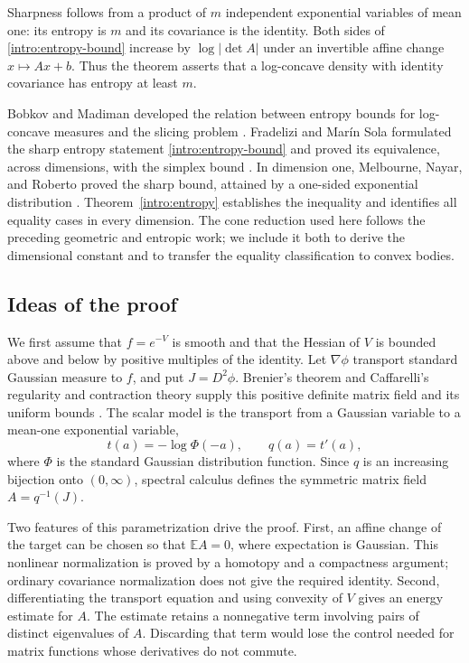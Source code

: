 \documentclass[11pt]{article}
\theoremstyle{definition}
\theoremstyle{remark}
\numberwithin{equation}{section}
\begin{document}
Sharpness follows from a product of $m$ independent exponential variables
of mean one: its entropy is $m$ and its covariance is the identity.
Both sides of \eqref{intro:entropy-bound} increase by $\log|\det A|$
under an invertible affine change $x\mapsto Ax+b$.  Thus the theorem
asserts that a log-concave density with identity covariance has entropy
at least $m$.

Bobkov and Madiman developed the relation between entropy bounds for
log-concave measures and the slicing problem \cite{BobkovMadiman2011}.
Fradelizi and Mar\'in Sola formulated the sharp entropy statement
\eqref{intro:entropy-bound} and proved its equivalence, across dimensions,
with the simplex bound \cite[Conjecture~3(iii) and Proposition~5.2]{FradeliziMarinSola2026}.
In dimension one, Melbourne, Nayar, and Roberto proved the sharp bound,
attained by a one-sided exponential distribution
\cite[Theorem~1.1]{MelbourneNayarRoberto2026}.
Theorem~\ref{intro:entropy} establishes the inequality and identifies
all equality cases in every dimension.
The cone reduction used here follows the preceding geometric and
entropic work; we include it both to derive the dimensional constant
and to transfer the equality classification to convex bodies.

\subsection{Ideas of the proof}

We first assume that $f=e^{-V}$ is smooth and that the Hessian of $V$ is
bounded above and below by positive multiples of the identity.
Let $\nabla\phi$ transport standard Gaussian measure to $f$, and put
$J=D^2\phi$.  Brenier's theorem and Caffarelli's regularity and
contraction theory supply this positive definite matrix field and its
uniform bounds
\cite{Brenier1991,McCann1995,Caffarelli2000,CorderoErausquinFigalli2019}.
The scalar model is the transport from a Gaussian variable to a
mean-one exponential variable,
\[
 t(a)=-\log\Phi(-a),\qquad q(a)=t'(a),
\]
where $\Phi$ is the standard Gaussian distribution function.  Since $q$
is an increasing bijection onto $(0,\infty)$, spectral calculus defines
the symmetric matrix field $A=q^{-1}(J)$.

Two features of this parametrization drive the proof.  First, an affine
change of the target can be chosen so that $\mathbb E A=0$, where expectation
is Gaussian.  This nonlinear normalization is proved by a homotopy and
a compactness argument; ordinary covariance normalization does not
give the required identity.  Second, differentiating the transport
equation and using convexity of $V$ gives an energy estimate for $A$.
The estimate retains a nonnegative term involving pairs of distinct
eigenvalues of $A$.  Discarding that term would lose the control needed
for matrix functions whose derivatives do not commute.
\end{document}
